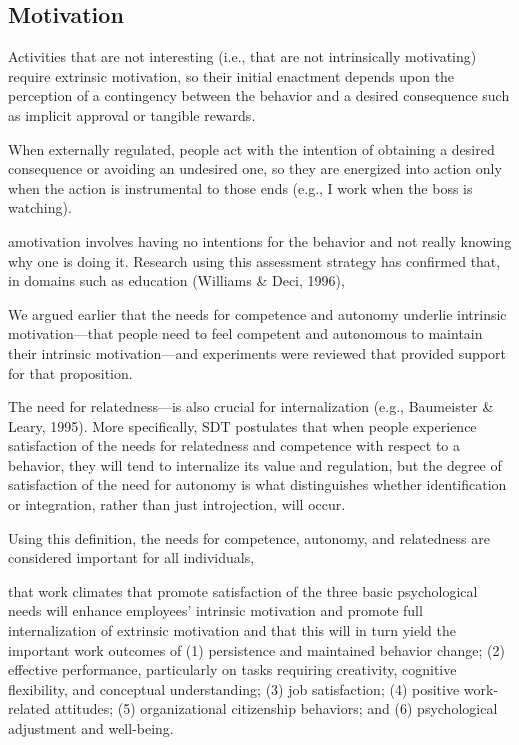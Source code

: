 \subsection{Motivation}
Activities that are not interesting (i.e., that are not intrinsically motivating) require extrinsic motivation, so their initial enactment depends upon the perception of a contingency between the behavior and a desired consequence such as implicit approval or tangible rewards.

When externally regulated, people act with the intention of obtaining a desired consequence or avoiding an undesired one, so they are energized into action only when the action is instrumental to those ends (e.g., I work when the boss is watching).

amotivation involves having no intentions for the behavior and not really knowing why one is doing it. Research using this assessment strategy has conﬁrmed that, in domains such as education (Williams & Deci, 1996),

We argued earlier that the needs for competence and autonomy underlie intrinsic motivation—that people need to feel competent and autonomous to maintain their intrinsic motivation—and experiments were reviewed that provided support for that proposition.

The need for relatedness—is also crucial for internalization (e.g., Baumeister & Leary, 1995). More speciﬁcally, SDT postulates that when people experience satisfaction of the needs for relatedness and competence with respect to a behavior, they will tend to internalize its value and regulation, but the degree of satisfaction of the need for autonomy is what distinguishes whether identiﬁcation or integration, rather than just introjection, will occur.

Using this deﬁnition, the needs for competence, autonomy, and relatedness are considered important for all individuals,

that work climates that promote satisfaction of the three basic psychological needs will enhance employees’ intrinsic motivation and promote full internalization of extrinsic motivation and that this will in turn yield the important work outcomes of (1) persistence and maintained behavior change; (2) effective performance, particularly on tasks requiring creativity, cognitive ﬂexibility, and conceptual understanding; (3) job satisfaction; (4) positive work-related attitudes; (5) organizational citizenship behaviors; and (6) psychological adjustment and well-being.


